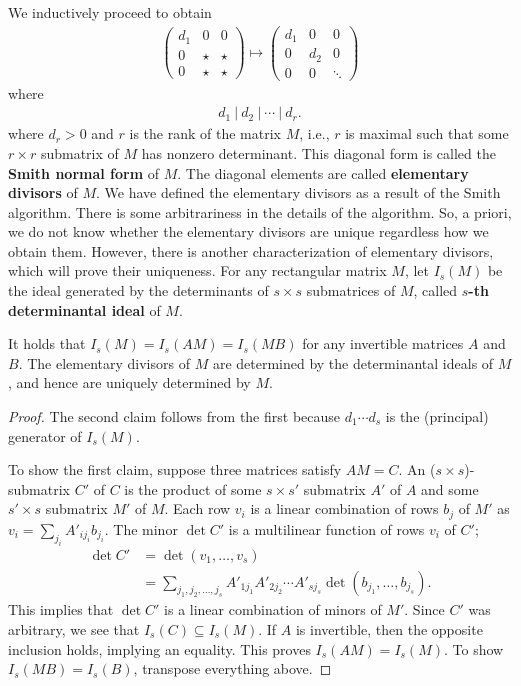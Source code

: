 We inductively proceed to obtain
\begin{align}
 \begin{pmatrix}
  d_1 & 0 & 0 \\ 0 & \star & \star \\ 0 & \star & \star 
 \end{pmatrix} \mapsto
  \begin{pmatrix}
  d_1 & 0 & 0 \\ 0 & d_2 & 0 \\ 0 & 0 & \ddots 
 \end{pmatrix}
\end{align}
where
\begin{align}
 d_1 ~|~ d_2 ~|~ \cdots ~|~ d_{r}.
\end{align}
where $d_r > 0$ and $r$ is the rank of the matrix $M$,
i.e., $r$ is maximal such that some $r \times r$ submatrix of $M$ has nonzero determinant.
This diagonal form is called the {\bf Smith normal form} of $M$.
The diagonal elements are called {\bf elementary divisors} of $M$.
We have defined the elementary divisors as a result of the Smith algorithm.
There is some arbitrariness in the details of the algorithm.
So, a priori, we do not know whether the elementary divisors
are unique regardless how we obtain them.
However, there is another characterization of elementary divisors,
which will prove their uniqueness.
For any rectangular matrix $M$, let $I_s(M)$ be 
the ideal generated by the determinants of $s \times s$ submatrices of $M$,
called {\bf $s$-th determinantal ideal} of $M$.
\begin{prop}
It holds that $I_s(M) = I_s(AM) = I_s(MB)$ for any invertible matrices $A$ and $B$.
The elementary divisors of $M$ are determined by the determinantal ideals of $M$,
and hence are uniquely determined by $M$.
\end{prop}
\begin{proof}
The second claim follows from the first because
$d_1 \cdots d_s$ is the (principal) generator of $I_s(M)$.

To show the first claim, suppose three matrices satisfy $AM=C$.
An ($s \times s$)-submatrix $C'$ of $C$ is the product of some $s \times s'$ submatrix $A'$ of $A$ 
and some $s' \times s$ submatrix $M'$ of $M$.
Each row $v_i$ is a linear combination of rows $b_j$ of $M'$ as $v_i = \sum_{j_i} A'_{i j_i} b_{j_i}$.
The minor $\det C'$ is a multilinear function of rows $v_i$ of $C'$;
\begin{align}
\det C' 
&= \det( v_1, \ldots, v_s ) \\
&= \sum_{j_1, j_2,\ldots, j_s} A'_{1 j_1} A'_{2 j_2} \cdots A'_{s j_s} \det( b_{j_1}, \ldots, b_{j_s} ) .
\end{align}
This implies that $\det C'$ is a linear combination of minors of $M'$.
Since $C'$ was arbitrary, we see that $I_s(C) \subseteq I_s(M)$.
If $A$ is invertible, then the opposite inclusion holds, implying an equality.
This proves $I_s(AM) = I_s(M)$.
To show $I_s(MB) = I_s(B)$, transpose everything above.
\end{proof}
